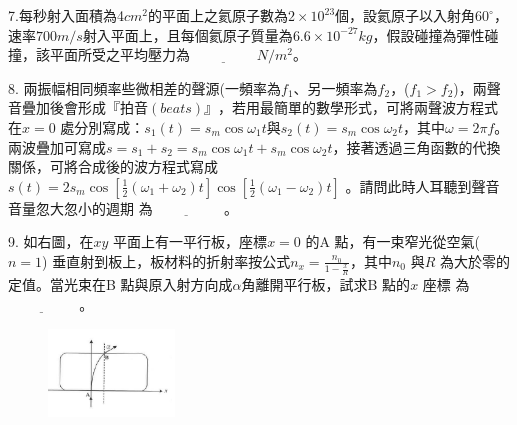 \documentclass[cn,10pt,math=newtx,chinesefont=founder,device=ig]{elegantbook}
\begin{document}
\begin{example}
   7.每秒射入面積為4$cm^2$的平面上之氦原子數為$2\times10^23$個，設氦原子以入射角$60^\circ$，速率$700 m/s$射入平面上，且每個氦原子質量為$6.6\times10^{-27}kg$，假設碰撞為彈性碰撞，該平面所受之平均壓力為$\underline{\hspace{2cm}} N/m^2$。\\
    \rightline{[中壢高中教甄109]}
\end{example}
\begin{solution}
    
\end{solution}

\newpage

\begin{example}
   8. 兩振幅相同頻率些微相差的聲源(一頻率為$f_1$、另一頻率為$f_2$，($f_1 > f_2$)，兩聲音疊加後會形成$『拍音(beats)』$，若用最簡單的數學形式，可將兩聲波方程式在$x=0$ 處分別寫成：$s_1 (t) = s_m \cos{\omega_1 t}$與$s_2 (t) = s_m \cos{\omega_2 t}$，其中$\omega = 2\pi f$。兩波疊加可寫成$s = s_1 + s_2 =s_m \cos{\omega_1 t}+ s_m \cos{\omega_2 t} $，接著透過三角函數的代換關係，可將合成後的波方程式寫成$s(t) = 2s_m \cos{[\frac{1}{2}(\omega_1+\omega_2) t]} \cos{[\frac{1}{2}(\omega_1-\omega_2) t]}$
。請問此時人耳聽到聲音音量忽大忽小的週期
為$\underline{\hspace{2cm}}$ 。\\
    \rightline{[中壢高中教甄109]}
\end{example}
\begin{solution}
    
\end{solution}

\newpage


\begin{example}
   9. 如右圖，在$xy$ 平面上有一平行板，座標$x=0$ 的A 點，有一束窄光從空氣($n=1$)
垂直射到板上，板材料的折射率按公式$n_x = \frac{n_0}{1-\frac{x}{R}}$，其中$n_0$ 與$R$ 為大於零的定值。當光束在B 點與原入射方向成$\alpha$角離開平行板，試求B 點的$x$ 座標
為$\underline{\hspace{2cm}}$ 。\\
    \rightline{[中壢高中教甄109]}
\end{example}
\begin{solution}
    
\end{solution}
\begin{figure}[htbp]
    \flushright
    \includegraphics[width=0.3\textwidth]{image/109中壢9.png}
  \end{figure}
\newpage
\end{document}

